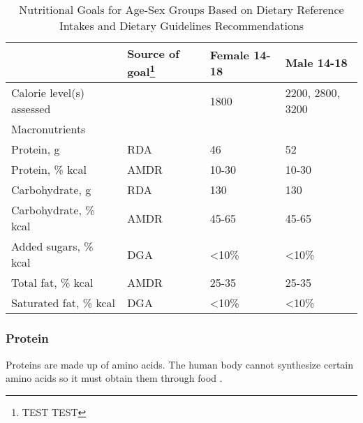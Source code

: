 \documentclass[letterpaper,oneside,12pt]{report}
\begin{document}
\begin{table}[]
\centering
\caption{
Nutritional Goals for Age-Sex Groups Based on Dietary Reference Intakes and Dietary Guidelines Recommendations
}
\label{NutritionGoal}
\begin{tabular}{@{}llll@{}}
\toprule
                                                & Source of goal\footnote{TEST TEST}            & Female 14-18                       & Male 14-18                            \\ \midrule
\multicolumn{1}{|l|}{Calorie level(s) assessed} & \multicolumn{1}{l|}{}     & \multicolumn{1}{l|}{1800}          & \multicolumn{1}{l|}{2200, 2800, 3200} \\ \midrule
\multicolumn{1}{|l|}{Macronutrients}            & \multicolumn{1}{l|}{}     & \multicolumn{1}{l|}{}              & \multicolumn{1}{l|}{}                 \\ \midrule
\multicolumn{1}{|l|}{Protein, g}                & \multicolumn{1}{l|}{RDA}  & \multicolumn{1}{l|}{46}            & \multicolumn{1}{l|}{52}               \\ \midrule
\multicolumn{1}{|l|}{Protein, \% kcal}          & \multicolumn{1}{l|}{AMDR} & \multicolumn{1}{l|}{10-30}         & \multicolumn{1}{l|}{10-30}            \\ \midrule
\multicolumn{1}{|l|}{Carbohydrate, g}           & \multicolumn{1}{l|}{RDA}  & \multicolumn{1}{l|}{130}           & \multicolumn{1}{l|}{130}              \\ \midrule
\multicolumn{1}{|l|}{Carbohydrate, \% kcal}     & \multicolumn{1}{l|}{AMDR} & \multicolumn{1}{l|}{45-65}         & \multicolumn{1}{l|}{45-65}            \\ \midrule
\multicolumn{1}{|l|}{Added sugars, \% kcal}     & \multicolumn{1}{l|}{DGA}  & \multicolumn{1}{l|}{<10\%} & \multicolumn{1}{l|}{<10\%}    \\ \midrule
\multicolumn{1}{|l|}{Total fat, \% kcal}        & \multicolumn{1}{l|}{AMDR} & \multicolumn{1}{l|}{25-35}         & \multicolumn{1}{l|}{25-35}            \\ \midrule
\multicolumn{1}{|l|}{Saturated fat, \% kcal}    & \multicolumn{1}{l|}{DGA}  & \multicolumn{1}{l|}{<10\%}         & \multicolumn{1}{l|}{<10\%}                        \\ \bottomrule
\end{tabular}
\end{table}

\subsubsection{Protein}\label{Protein}
Proteins are made up of amino acids. The human body cannot synthesize certain amino acids so it must obtain them through food \cite{Macro}. 
\end{document}
